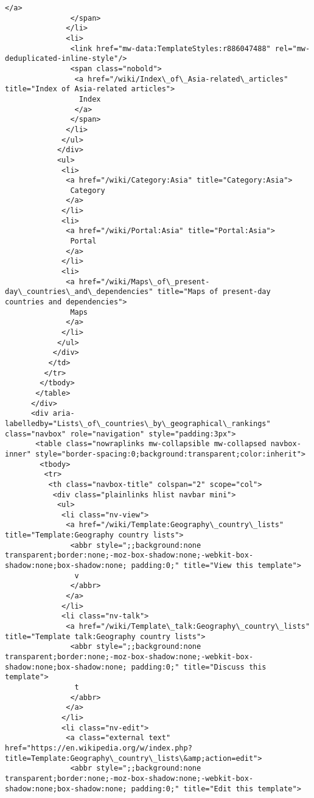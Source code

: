 \documentclass[11pt]{article}
\begin{document}
\begin{Verbatim}[commandchars=\\\{\}]
                </a>
               </span>
              </li>
              <li>
               <link href="mw-data:TemplateStyles:r886047488" rel="mw-deduplicated-inline-style"/>
               <span class="nobold">
                <a href="/wiki/Index\_of\_Asia-related\_articles" title="Index of Asia-related articles">
                 Index
                </a>
               </span>
              </li>
             </ul>
            </div>
            <ul>
             <li>
              <a href="/wiki/Category:Asia" title="Category:Asia">
               Category
              </a>
             </li>
             <li>
              <a href="/wiki/Portal:Asia" title="Portal:Asia">
               Portal
              </a>
             </li>
             <li>
              <a href="/wiki/Maps\_of\_present-day\_countries\_and\_dependencies" title="Maps of present-day countries and dependencies">
               Maps
              </a>
             </li>
            </ul>
           </div>
          </td>
         </tr>
        </tbody>
       </table>
      </div>
      <div aria-labelledby="Lists\_of\_countries\_by\_geographical\_rankings" class="navbox" role="navigation" style="padding:3px">
       <table class="nowraplinks mw-collapsible mw-collapsed navbox-inner" style="border-spacing:0;background:transparent;color:inherit">
        <tbody>
         <tr>
          <th class="navbox-title" colspan="2" scope="col">
           <div class="plainlinks hlist navbar mini">
            <ul>
             <li class="nv-view">
              <a href="/wiki/Template:Geography\_country\_lists" title="Template:Geography country lists">
               <abbr style=";;background:none transparent;border:none;-moz-box-shadow:none;-webkit-box-shadow:none;box-shadow:none; padding:0;" title="View this template">
                v
               </abbr>
              </a>
             </li>
             <li class="nv-talk">
              <a href="/wiki/Template\_talk:Geography\_country\_lists" title="Template talk:Geography country lists">
               <abbr style=";;background:none transparent;border:none;-moz-box-shadow:none;-webkit-box-shadow:none;box-shadow:none; padding:0;" title="Discuss this template">
                t
               </abbr>
              </a>
             </li>
             <li class="nv-edit">
              <a class="external text" href="https://en.wikipedia.org/w/index.php?title=Template:Geography\_country\_lists\&amp;action=edit">
               <abbr style=";;background:none transparent;border:none;-moz-box-shadow:none;-webkit-box-shadow:none;box-shadow:none; padding:0;" title="Edit this template">

\end{Verbatim}
\end{document}
